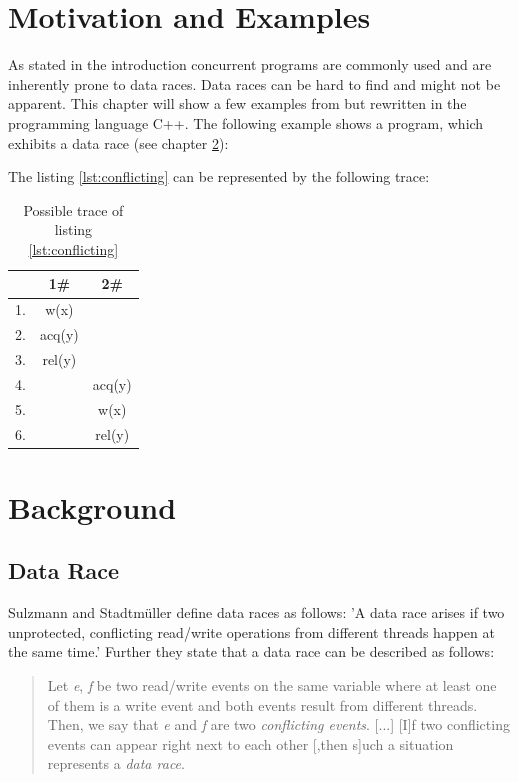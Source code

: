 \documentclass[12pt]{article}
\begin{document}
	\section{Motivation and Examples}
	As stated in the introduction concurrent programs are commonly used and are inherently prone to data races. Data races can be hard to find and might not be apparent. This chapter will show a few examples from \cite{sulzmann2} but rewritten in the programming language C++. The following example shows a program, which exhibits a data race (see chapter \ref{background}):
	
	The listing \ref{lst:conflicting} can be represented by the following trace:
	\begin{table}[h]
		\begin{center}
			\begin{tabular}{ c c c}
				& 1\# & 2\# \\
				\hline
				1. & w(x) & \\
				2. & acq(y) & \\
				3. & rel(y) & \\
				4. & & acq(y) \\
				5. & & w(x) \\
				6. & & rel(y) \\
			\end{tabular}
			\caption{Possible trace of listing \ref{lst:conflicting}}
		\end{center}
	\end{table}
	
	
	\section{Background}\label{background}
		\subsection{Data Race}
		Sulzmann and Stadtm\"uller \cite[p. 1]{sulzmann} define data races as follows: 'A data race arises if two unprotected, conflicting read/write operations from different threads happen at the same time.' Further they state that a data race can be described as follows: 
		\begin{quote}
			Let \textit{e}, \textit{f} be two read/write events on the same variable where at least one of them is a write event and both events result from different threads. Then, we say that \textit{e} and \textit{f} are two \textit{conflicting events}. [...] [I]f two conflicting events can appear right next to each other [,then s]uch a situation represents a \textit{data race}.
		\end{quote}
	
\end{document}
